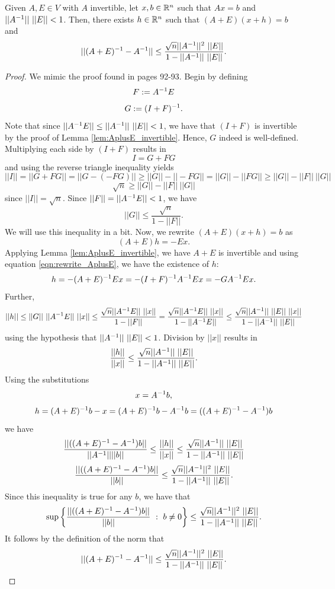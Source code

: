 \documentclass[letterpaper,titlepage]{article}
\begin{document}
\begin{lem}\label{lem:AplusEinv_minus_Ainv_ineq}
    Given $A, E\in V$ with $A$ invertible, let $x,b \in \mathbb{R}^n$ such that $Ax=b$ and $||A^{-1}||\ ||E||<1$. Then, there exists $h\in \mathbb{R}^n$ such that $(A+E)(x+h)=b$ and
    $$||(A+E)\inv-A\inv||\leq\frac{\sqrt{n}||A\inv||^2\ ||E||}{1-||A\inv||\ ||E||}.$$   
\end{lem}
\begin{proof}%
    We mimic the proof found in \cite{Wilkinson} pages 92-93. Begin by defining
    $$F:=A^{-1} E$$
    $$G:=(I+F)^{-1}.$$
    Note that since $||A^{-1} E|| \leq ||A^{-1}||\ ||E||<1$, we have that $(I+F)$ is invertible by the proof of Lemma \ref{lem:AplusE_invertible}. Hence, $G$ indeed is well-defined.
    Multiplying each side by $(I+F)$ results in
    $$I = G+FG$$
    and using the reverse triangle inequality yields
    $$||I|| = ||G+FG|| = ||G-(-FG)|| \geq ||G||-||-FG|| = ||G||-||FG|| \geq ||G||-||F||\ ||G||$$
    $$\sqrt{n} \geq ||G|| -||F||\ ||G||$$
    since $||I||=\sqrt{n}$. Since $||F||=||A^{-1} E|| <1$, we have
    $$||G|| \leq \frac{\sqrt{n}}{1-||F||}.$$
    We will use this inequality in a bit. Now, we rewrite $(A+E)(x+h)=b$ as
    $$(A+E)h=-Ex.$$
    Applying Lemma \ref{lem:AplusE_invertible}, we have $A+E$ is invertible and using equation \ref{eqn:rewrite_AplusE}, we have the existence of $h$:
    $$h = -(A+E)^{-1} Ex = -(I+F)^{-1} A^{-1} Ex=-GA^{-1} Ex.$$
    Further,
    $$||h|| \leq ||G||\ ||A\inv E||\ ||x|| \leq \frac{\sqrt{n}||A\inv E||\ ||x||}{1-||F||} = \frac{\sqrt{n}||A\inv E||\ ||x||}{1-||A\inv E||} \leq \frac{\sqrt{n}||A\inv||\ ||E||\ ||x||}{1-||A\inv||\ ||E||}$$
    using the hypothesis that $||A^{-1}||\ ||E|| < 1$.
    Division by $||x||$ results in
    $$\frac{||h||}{||x||}\leq \frac{\sqrt{n}||A^{-1}||\ ||E||}{1-||A^{-1}||\ ||E||}.$$
    Using the substitutions
    $$x = A^{-1} b,$$
    $$h = (A+E)^{-1} b - x = (A+E)^{-1} b - A^{-1} b = ((A+E)^{-1} -A^{-1})b$$
    we have
    $$\frac{||((A+E)\inv -A\inv)b||}{||A\inv||||b||} \leq \frac{||h||}{||x||} \leq \frac{\sqrt{n}||A\inv||\ ||E||}{1-||A\inv||\ ||E||} $$
    $$\frac{||((A+E)^{-1} -A^{-1})b||}{||b||} \leq \frac{\sqrt{n}||A^{-1}||^2\ ||E||}{1-||A^{-1}||\ ||E||}.$$
    Since this inequality is true for any $b$, we have that
    $$\sup\left\{\frac{||((A+E)\inv -A\inv)b||}{||b||}\ :\ b\neq 0\right\} \leq \frac{\sqrt{n}||A\inv||^2\ ||E||}{1-||A\inv||\ ||E||}.$$
    It follows by the definition of the norm that
    $$||(A+E)\inv-A\inv||\leq\frac{\sqrt{n}||A\inv||^2\ ||E||}{1-||A\inv||\ ||E||}.$$

\end{proof}
\end{document}
